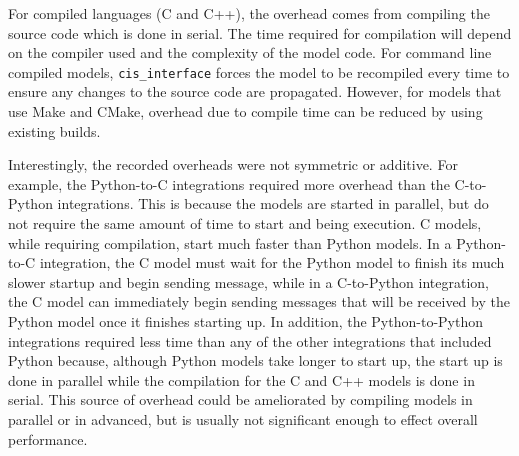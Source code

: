 \documentclass[journal]{IEEEtran}
\newcommand{\cis}{{\tt cis\_interface}{}}
\begin{document}
For compiled languages (C and C++), the overhead comes from compiling the source code which is done in serial. The time required for compilation will depend on the compiler used and the complexity of the model code. For command line compiled models, {\cis} forces the model to be recompiled every time to ensure any changes to the source code are propagated. However, for models that use Make and CMake, overhead due to compile time can be reduced by using existing builds.

Interestingly, the recorded overheads were not symmetric or additive. For example, the Python-to-C integrations required more overhead than the C-to-Python integrations. This is because the models are started in parallel, but do not require the same amount of time to start and being execution. C models, while requiring compilation, start much faster than Python models. In a Python-to-C integration, the C model must wait for the Python model to finish its much slower startup and begin sending message, while in a C-to-Python integration, the C model can immediately begin sending messages that will be received by the Python model once it finishes starting up. In addition, the Python-to-Python integrations required less time than any of the other integrations that included Python because, although Python models take longer to start up, the start up is done in parallel while the compilation for the C and C++ models is done in serial. This source of overhead could be ameliorated by compiling models in parallel or in advanced, but is usually not significant enough to effect overall performance.


\end{document}
